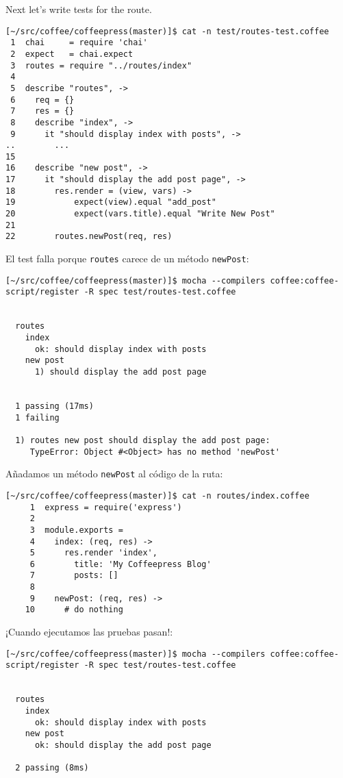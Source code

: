 Next let’s write tests for the  route.

\begin{verbatim}
[~/src/coffee/coffeepress(master)]$ cat -n test/routes-test.coffee 
 1  chai     = require 'chai'
 2  expect   = chai.expect
 3  routes = require "../routes/index"
 4  
 5  describe "routes", ->
 6    req = {}
 7    res = {}
 8    describe "index", ->
 9      it "should display index with posts", ->
..        ...
15  
16    describe "new post", ->
17      it "should display the add post page", ->
18        res.render = (view, vars) ->
19            expect(view).equal "add_post"
20            expect(vars.title).equal "Write New Post"
21      
22        routes.newPost(req, res)
\end{verbatim}
El test falla porque \verb|routes| carece de un método \verb'newPost':
\begin{verbatim}
[~/src/coffee/coffeepress(master)]$ mocha --compilers coffee:coffee-script/register -R spec test/routes-test.coffee 


  routes
    index
      ok: should display index with posts 
    new post
      1) should display the add post page


  1 passing (17ms)
  1 failing

  1) routes new post should display the add post page:
     TypeError: Object #<Object> has no method 'newPost'
\end{verbatim}

Añadamos un método \verb'newPost' al código de la ruta:
\begin{verbatim}
[~/src/coffee/coffeepress(master)]$ cat -n routes/index.coffee 
     1  express = require('express')
     2  
     3  module.exports = 
     4    index: (req, res) ->
     5      res.render 'index', 
     6        title: 'My Coffeepress Blog' 
     7        posts: []
     8  
     9    newPost: (req, res) ->
    10      # do nothing
\end{verbatim}
¡Cuando ejecutamos las pruebas pasan!:
\begin{verbatim}
[~/src/coffee/coffeepress(master)]$ mocha --compilers coffee:coffee-script/register -R spec test/routes-test.coffee 


  routes
    index
      ok: should display index with posts 
    new post
      ok: should display the add post page 

  2 passing (8ms)
\end{verbatim}

